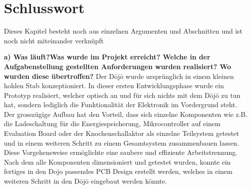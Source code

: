 \section{Schlusswort} \label{sec:schlusswort}

Dieses Kapitel besteht noch aus einzelnen Argumenten und Abschnitten und ist noch nicht miteinander verknüpft

\textbf{a) Was läuft?Was wurde im Projekt erreicht? Welche in der Aufgabenstellung gestellten Anforderungen wurden realisiert? Wo wurden diese übertroffen?}
Der Dōjō wurde ursprünglich in einem kleinen hohlen Stab konzeptioniert. In dieser ersten Entwicklungsphase wurde ein Prototyp realisiert, welcher optisch an und für sich nichts mit dem Dōjō zu tun hat, sondern lediglich die Funktionalität der Elektronik im Vordergrund steht. Der grosszügige Aufbau hat den Vorteil, dass sich einzelne Komponenten wie z.B. die Ladeschaltung für die Energiespeicherung, Mikrocontroller auf einem Evaluation Board oder der Knochenschallaktor als einzelne Teilsystem getestet und in einem weiteren Schritt zu einem Gesamtsystem zusammenbauen lassen. Diese Vorgehensweise ermöglichte eine saubere und effiziente Arbeitstrennung. Nach dem alle Komponenten dimensioniert und getestet wurden, konnte ein fertiges in den Dojo passendes PCB Design erstellt werden, welches in einem weiteren Schritt in den Dōjō eingebaut werden könnte.
 
